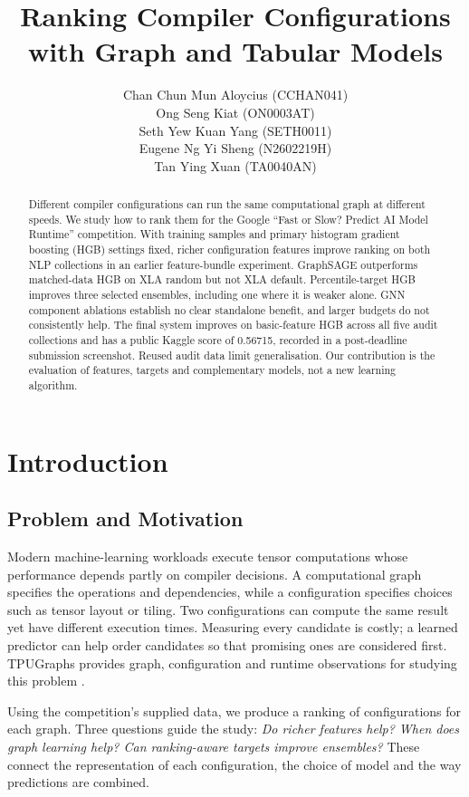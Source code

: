 \documentclass[letterpaper]{article}
\title{Ranking Compiler Configurations with Graph and Tabular Models}
\author{Chan Chun Mun Aloycius (CCHAN041)\\
Ong Seng Kiat (ON0003AT)\\
Seth Yew Kuan Yang (SETH0011)\\
Eugene Ng Yi Sheng (N2602219H)\\
Tan Ying Xuan (TA0040AN)}
\begin{document}
\maketitle
\begin{abstract}
Different compiler configurations can run the same computational graph at different speeds. We study how to rank them for the Google ``Fast or Slow? Predict AI Model Runtime'' competition. With training samples and primary histogram gradient boosting (HGB) settings fixed, richer configuration features improve ranking on both NLP collections in an earlier feature-bundle experiment. GraphSAGE outperforms matched-data HGB on XLA random but not XLA default. Percentile-target HGB improves three selected ensembles, including one where it is weaker alone. GNN component ablations establish no clear standalone benefit, and larger budgets do not consistently help. The final system improves on basic-feature HGB across all five audit collections and has a public Kaggle score of 0.56715, recorded in a post-deadline submission screenshot. Reused audit data limit generalisation. Our contribution is the evaluation of features, targets and complementary models, not a new learning algorithm.
\end{abstract}

\section{Introduction}
\subsection{Problem and Motivation}
Modern machine-learning workloads execute tensor computations whose performance depends partly on compiler decisions. A computational graph specifies the operations and dependencies, while a configuration specifies choices such as tensor layout or tiling. Two configurations can compute the same result yet have different execution times. Measuring every candidate is costly; a learned predictor can help order candidates so that promising ones are considered first. TPUGraphs provides graph, configuration and runtime observations for studying this problem \citep{tpugraphs}.

Using the competition's supplied data, we produce a ranking of configurations for each graph. Three questions guide the study: \emph{Do richer features help? When does graph learning help? Can ranking-aware targets improve ensembles?} These connect the representation of each configuration, the choice of model and the way predictions are combined.
\end{document}
